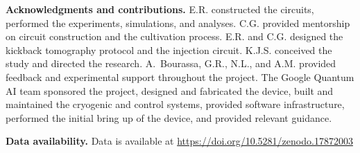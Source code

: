 \documentclass[%
 reprint,
 amsmath,amssymb,
 aps,
]{revtex4-2}
\begin{document}
\textbf{Acknowledgments and contributions.} E.R. constructed the circuits, performed the experiments, simulations, and analyses. C.G. provided mentorship on circuit construction and the cultivation process. E.R. and C.G. designed the kickback tomography protocol and the injection circuit. K.J.S. conceived the study and directed the research. A.~Bourassa, G.R., N.L., and A.M. provided feedback and experimental support throughout the project.
The Google Quantum AI team sponsored the project, designed and fabricated the device, built and maintained the cryogenic and control systems, provided software infrastructure, performed the initial bring up of the device, and provided relevant guidance.

\textbf{Data availability.} Data is available at \href{https://doi.org/10.5281/zenodo.17872003
}{https://doi.org/10.5281/zenodo.17872003}


\end{document}
